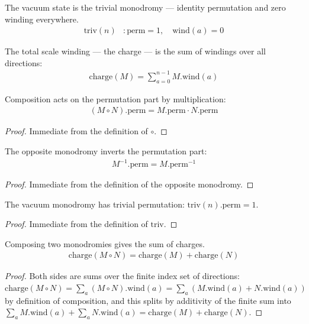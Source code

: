 \begin{definition}
The vacuum state is the trivial monodromy — identity permutation and zero winding everywhere.
\begin{align*}
\text{triv}(n) &: \text{perm} = 1, \quad \text{wind}(a) = 0
\end{align*}
\end{definition}

\begin{definition}
The total scale winding — the charge — is the sum of windings over all directions:
\begin{align*}
\text{charge}(M) = \sum_{a=0}^{n-1} M.\text{wind}(a)
\end{align*}
\end{definition}

\begin{proposition}
Composition acts on the permutation part by multiplication:
\begin{align*}
(M \circ N).\text{perm} = M.\text{perm} \cdot N.\text{perm}
\end{align*}
\end{proposition}
\begin{proof}
Immediate from the definition of $\circ$.
\end{proof}

\begin{proposition}
The opposite monodromy inverts the permutation part:
\begin{align*}
M^{-1}.\text{perm} = M.\text{perm}^{-1}
\end{align*}
\end{proposition}
\begin{proof}
Immediate from the definition of the opposite monodromy.
\end{proof}

\begin{proposition}
The vacuum monodromy has trivial permutation: $\text{triv}(n).\text{perm} = 1$.
\end{proposition}
\begin{proof}
Immediate from the definition of $\text{triv}$.
\end{proof}

\begin{proposition}
Composing two monodromies gives the sum of charges.
\begin{align*}
\text{charge}(M \circ N) = \text{charge}(M) + \text{charge}(N)
\end{align*}
\begin{proof}
Both sides are sums over the finite index set of directions: $\text{charge}(M\circ N)=\sum_a (M\circ N).\text{wind}(a) = \sum_a (M.\text{wind}(a)+N.\text{wind}(a))$ by definition of composition, and this splits by additivity of the finite sum into $\sum_a M.\text{wind}(a) + \sum_a N.\text{wind}(a) = \text{charge}(M)+\text{charge}(N)$.
\end{proof}
\end{proposition}

